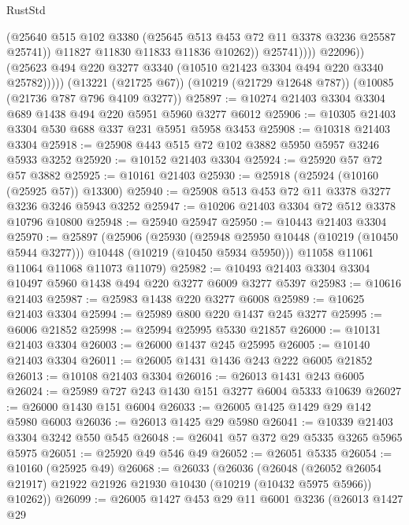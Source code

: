\begin{lexlean}{RustStd}
\begin{coremodule}
                          (@25640
                            @515
                            @102
                            @3380
                            (@25645 @513 @453 @72 @11 @3378 @3236 @25587 @25741))
                          @11827
                          @11830
                          @11833
                          @11836
                          @10262))
                      @25741))))
              @22096))
          (@25623 @494 @220 @3277 @3340 (@10510 @21423 @3304 @494 @220 @3340 @25782)))))
    (@13221 (@21725 @67))
    (@10219 (@21729 @12648 @787))
    (@10085 (@21736 @787 @796 @4109 @3277))
@25897 := @10274 @21403 @3304 @3304 @689 @1438 @494 @220 @5951 @5960 @3277 @6012
@25906 := @10305 @21403 @3304 @530 @688 @337 @231 @5951 @5958 @3453
@25908 := @10318 @21403 @3304
@25918 := @25908 @443 @515 @72 @102 @3882 @5950 @5957 @3246 @5933 @3252
@25920 := @10152 @21403 @3304
@25924 := @25920 @57 @72 @57 @3882
@25925 := @10161 @21403
@25930 := @25918 (@25924 (@10160 (@25925 @57)) @13300)
@25940 := @25908 @513 @453 @72 @11 @3378 @3277 @3236 @3246 @5943 @3252
@25947 := @10206 @21403 @3304 @72 @512 @3378 @10796 @10800
@25948 := @25940 @25947
@25950 := @10443 @21403 @3304
@25970 := @25897
    (@25906
      (@25930
        (@25948 @25950 @10448 (@10219 (@10450 @5944 @3277)))
        @10448
        (@10219 (@10450 @5934 @5950)))
      @11058
      @11061
      @11064
      @11068
      @11073
      @11079)
@25982 := @10493 @21403 @3304 @3304 @10497 @5960 @1438 @494 @220 @3277 @6009 @3277 @5397
@25983 := @10616 @21403
@25987 := @25983 @1438 @220 @3277 @6008
@25989 := @10625 @21403 @3304
@25994 := @25989 @800 @220 @1437 @245 @3277
@25995 := @6006 @21852
@25998 := @25994 @25995 @5330 @21857
@26000 := @10131 @21403 @3304
@26003 := @26000 @1437 @245 @25995
@26005 := @10140 @21403 @3304
@26011 := @26005 @1431 @1436 @243 @222 @6005 @21852
@26013 := @10108 @21403 @3304
@26016 := @26013 @1431 @243 @6005
@26024 := @25989 @727 @243 @1430 @151 @3277 @6004 @5333 @10639
@26027 := @26000 @1430 @151 @6004
@26033 := @26005 @1425 @1429 @29 @142 @5980 @6003
@26036 := @26013 @1425 @29 @5980
@26041 := @10339 @21403 @3304 @3242 @550 @545
@26048 := @26041 @57 @372 @29 @5335 @3265 @5965 @5975
@26051 := @25920 @49 @546 @49
@26052 := @26051 @5335
@26054 := @10160 (@25925 @49)
@26068 := @26033
    (@26036
      (@26048
        (@26052 @26054 @21917)
        @21922
        @21926
        @21930
        @10430
        (@10219 (@10432 @5975 @5966))
        @10262))
@26099 := @26005
    @1427
    @453
    @29
    @11
    @6001
    @3236
    (@26013
      @1427
      @29

\end{coremodule}
\end{lexlean}
